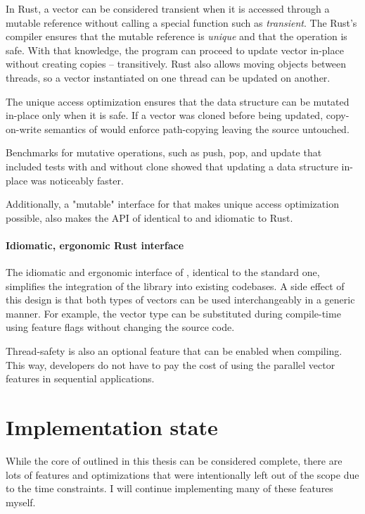 In Rust, a vector can be considered transient when it is accessed through a mutable reference without calling a special function such as \emph{transient}. The Rust's compiler ensures that the mutable reference is \emph{unique} and that the operation is safe. With that knowledge, the program can proceed to update vector in-place without creating copies -- transitively. Rust also allows moving objects between threads, so a vector instantiated on one thread can be updated on another. 

The unique access optimization ensures that the data structure can be mutated in-place only when it is safe. If a vector was cloned before being updated, copy-on-write semantics of \rc{} would enforce path-copying leaving the source untouched. 

Benchmarks for mutative operations, such as push, pop, and update that included tests with and without clone showed that updating a data structure in-place was noticeably faster. 

Additionally, a "mutable" interface for \pvec{} that makes unique access optimization possible, also makes the API of \pvec{} identical to \stdvec{} and idiomatic to Rust.

\paragraph{Idiomatic, ergonomic Rust interface}
The idiomatic and ergonomic interface of \pvecrs{}, identical to the standard one, simplifies the integration of the library into existing codebases. A side effect of this design is that both types of vectors can be used interchangeably in a generic manner. For example, the vector type can be substituted during compile-time using feature flags without changing the source code. 

Thread-safety is also an optional feature that can be enabled when compiling. This way, developers do not have to pay the cost of using the parallel vector features in sequential applications. 

\section{Implementation state}
While the core of \pvecrs{} outlined in this thesis can be considered complete, there are lots of features and optimizations that were intentionally left out of the scope due to the time constraints. I will continue implementing many of these features myself. 

